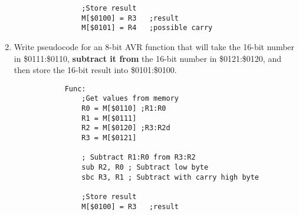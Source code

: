 \documentclass[12pt,letterpaper]{article}
\begin{document}
\begin{enumerate}
\begin{lstlisting}
				;Store result
				M[$0100] = R3	;result
				M[$0101] = R4	;possible carry
		\end{lstlisting}
	
	
		\item 
		Write pseudocode for an 8-bit AVR function that will take the 16-bit number in \$0111:\$0110,\textbf{ subtract it from} the 16-bit number in \$0121:\$0120, and then store the 16-bit result into \$0101:\$0100.
	
		\begin{lstlisting}
			Func:
				;Get values from memory
				R0 = M[$0110] ;R1:R0
				R1 = M[$0111]
				R2 = M[$0120] ;R3:R2d
				R3 = M[$0121]
			
				; Subtract R1:R0 from R3:R2
				sub R2, R0 ; Subtract low byte
				sbc R3, R1 ; Subtract with carry high byte
			
				;Store result
				M[$0100] = R3	;result
		\end{lstlisting}
	
	
	
	\end{enumerate}

	
	
\end{document}
